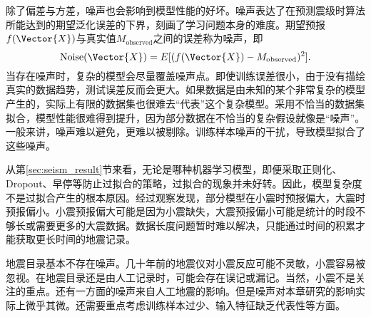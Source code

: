 除了偏差与方差，噪声也会影响到模型性能的好坏。噪声表达了在预测震级时算法所能达到的期望泛化误差的下界，刻画了学习问题本身的难度。期望预报$f(\Vector{X})$与真实值$M_{\text{observed}}$之间的误差称为噪声，即
\begin{equation}
  \label{eq:seism_noise}
  \text{Noise}(\Vector{X})=E[(f(\Vector{X})-M_{\text{observed}})^2].
\end{equation}
当存在噪声时，复杂的模型会尽量覆盖噪声点。即使训练误差很小，由于没有描绘真实的数据趋势，测试误差反而会更大。如果数据是由未知的某个非常复杂的模型产生的，实际上有限的数据集也很难去“代表”这个复杂模型。采用不恰当的数据集拟合，模型性能很难得到提升，因为部分数据在不恰当的复杂假设就像是“噪声”。一般来讲，噪声难以避免，更难以被剔除。训练样本噪声的干扰，导致模型拟合了这些噪声。

从第\ref{sec:seism_result}节来看，无论是哪种机器学习模型，即便采取正则化、Dropout、早停等防止过拟合的策略，过拟合的现象并未好转。因此，模型复杂度不是过拟合产生的根本原因。经过观察发现，部分模型在小震时预报偏大，大震时预报偏小。小震预报偏大可能是因为小震缺失，大震预报偏小可能是统计的时段不够长或需要更多的大震数据。数据长度问题暂时难以解决，只能通过时间的积累才能获取更长时间的地震记录。

地震目录基本不存在噪声。几十年前的地震仪对小震反应可能不灵敏，小震容易被忽视。在地震目录还是由人工记录时，可能会存在误记或漏记。当然，小震不是关注的重点。还有一方面的噪声来自人工地震的影响。但是噪声对本章研究的影响实际上微乎其微。还需要重点考虑训练样本过少、输入特征缺乏代表性等方面。



  
